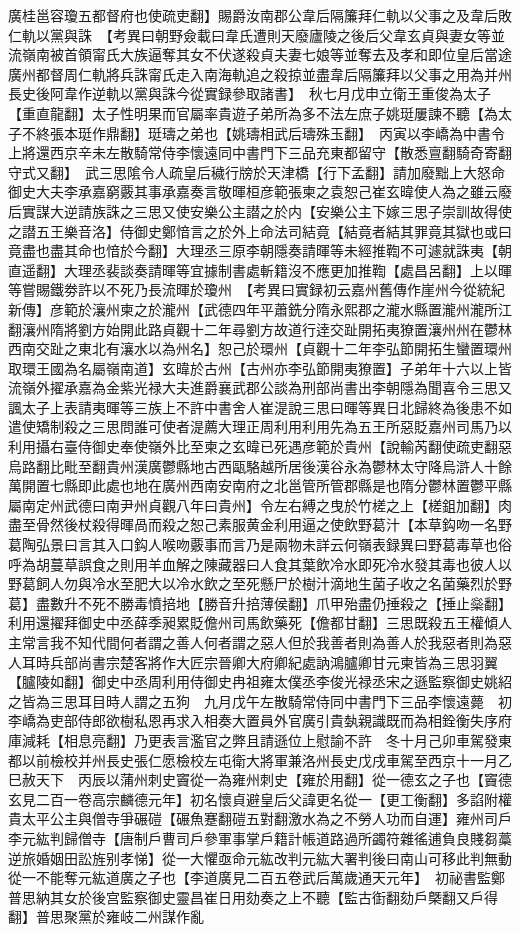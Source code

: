 廣桂邕容瓊五都督府也使疏吏翻】賜爵汝南郡公韋后隔簾拜仁軌以父事之及韋后敗仁軌以黨與誅　【考異曰朝野僉載曰韋氏遭則天廢廬陵之後后父韋玄貞與妻女等並流嶺南被首領甯氏大族逼奪其女不伏遂殺貞夫妻七娘等並奪去及孝和即位皇后當途廣州都督周仁軌將兵誅甯氏走入南海軌追之殺掠並盡韋后隔簾拜以父事之用為并州長史後阿韋作逆軌以黨與誅今從實録參取諸書】　秋七月戊申立衛王重俊為太子【重直龍翻】太子性明果而官屬率貴遊子弟所為多不法左庶子姚珽屢諫不聽【為太子不終張本珽作鼎翻】珽璹之弟也【姚璹相武后璹殊玉翻】　丙寅以李嶠為中書令　上將還西京辛未左散騎常侍李懷遠同中書門下三品充東都留守【散悉亶翻騎奇寄翻守式又翻】　武三思隂令人疏皇后穢行牓於天津橋【行下孟翻】請加廢黜上大怒命御史大夫李承嘉窮覈其事承嘉奏言敬暉桓彦範張柬之袁恕己崔玄暐使人為之雖云廢后實謀大逆請族誅之三思又使安樂公主譛之於内【安樂公主下嫁三思子崇訓故得使之譛五王樂音洛】侍御史鄭愔言之於外上命法司結竟【結竟者結其罪竟其獄也或曰竟盡也盡其命也愔於今翻】大理丞三原李朝隱奏請暉等未經推鞫不可遽就誅夷【朝直遥翻】大理丞裴談奏請暉等宜據制書處斬籍沒不應更加推鞫【處昌呂翻】上以暉等嘗賜鐵劵許以不死乃長流暉於瓊州　【考異曰實録初云嘉州舊傳作崖州今從統紀新傳】彦範於瀼州柬之於瀧州【武德四年平蕭銑分隋永熙郡之瀧水縣置瀧州瀧所江翻瀼州隋將劉方始開此路貞觀十二年尋劉方故道行逹交趾開拓夷獠置瀼州州在鬱林西南交趾之東北有瀼水以為州名】恕己於環州【貞觀十二年李弘節開拓生蠻置環州取環王國為名屬嶺南道】玄暐於古州【古州亦李弘節開夷獠置】子弟年十六以上皆流嶺外擢承嘉為金紫光禄大夫進爵襄武郡公談為刑部尚書出李朝隱為聞喜令三思又諷太子上表請夷暉等三族上不許中書舍人崔湜說三思曰暉等異日北歸終為後患不如遣使矯制殺之三思問誰可使者湜薦大理正周利用利用先為五王所惡貶嘉州司馬乃以利用攝右臺侍御史奉使嶺外比至柬之玄暐已死遇彦範於貴州【說輸芮翻使疏吏翻惡烏路翻比毗至翻貴州漢廣鬱縣地古西甌駱越所居後漢谷永為鬱林太守降烏滸人十餘萬開置七縣即此處也地在廣州西南安南府之北邕管所管郡縣是也隋分鬱林置鬱平縣屬南定州武德曰南尹州貞觀八年曰貴州】令左右縛之曳於竹槎之上【槎鉏加翻】肉盡至骨然後杖殺得暉咼而殺之恕己素服黄金利用逼之使飲野葛汁【本草鈎吻一名野葛陶弘景曰言其入口鈎人喉吻覈事而言乃是兩物未詳云何嶺表録異曰野葛毒草也俗呼為胡蔓草誤食之則用羊血解之陳藏器曰人食其葉飲冷水即死冷水發其毒也彼人以野葛飼人勿與冷水至肥大以冷水飲之至死懸尸於樹汁滴地生菌子收之名菌藥烈於野葛】盡數升不死不勝毒憤掊地【勝音升掊薄侯翻】爪甲殆盡仍捶殺之【捶止橤翻】利用還擢拜御史中丞薛季昶累貶儋州司馬飲藥死【儋都甘翻】三思既殺五王權傾人主常言我不知代間何者謂之善人何者謂之惡人但於我善者則為善人於我惡者則為惡人耳時兵部尚書宗楚客將作大匠宗晉卿大府卿紀處訥鴻臚卿甘元柬皆為三思羽翼【臚陵如翻】御史中丞周利用侍御史冉祖雍太僕丞李俊光禄丞宋之遜監察御史姚紹之皆為三思耳目時人謂之五狗　九月戊午左散騎常侍同中書門下三品李懷遠薨　初李嶠為吏部侍郎欲樹私恩再求入相奏大置員外官廣引貴埶親識既而為相銓衡失序府庫減耗【相息亮翻】乃更表言濫官之弊且請遜位上慰諭不許　冬十月己卯車駕發東都以前檢校并州長史張仁愿檢校左屯衛大將軍兼洛州長史戊戌車駕至西京十一月乙巳赦天下　丙辰以蒲州刺史竇從一為雍州刺史【雍於用翻】從一德玄之子也【竇德玄見二百一卷高宗麟德元年】初名懷貞避皇后父諱更名從一【更工衡翻】多諂附權貴太平公主與僧寺爭碾磑【碾魚蹇翻磑五對翻激水為之不勞人功而自運】雍州司戶李元紘判歸僧寺【唐制戶曹司戶參軍事掌戶籍計帳道路過所蠲符雜徭逋負良賤芻藁逆旅婚姻田訟旌别孝悌】從一大懼亟命元紘改判元紘大署判後曰南山可移此判無動從一不能奪元紘道廣之子也【李道廣見二百五卷武后萬歲通天元年】　初祕書監鄭普思納其女於後宫監察御史靈昌崔日用劾奏之上不聽【監古衘翻劾戶槩翻又戶得翻】普思聚黨於雍岐二州謀作亂